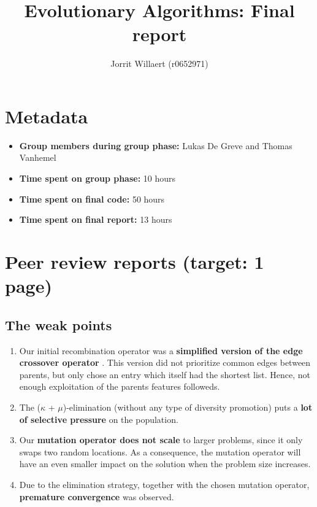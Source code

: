 \documentclass[a4paper,10pt]{article}
\title{Evolutionary Algorithms: Final report}
\author{Jorrit Willaert (r0652971)}
\newcommand{\ReplaceMe}[1]{{\color{blue}#1}}
\begin{document}
\selectfont{}


\maketitle

\section{Metadata}

\begin{itemize}
 \item \textbf{Group members during group phase:} Lukas De Greve and Thomas Vanhemel
 \item \textbf{Time spent on group phase:} \ReplaceMe{10 hours}
 \item \textbf{Time spent on final code:} \ReplaceMe{50 hours}
 \item \textbf{Time spent on final report:} \ReplaceMe{13 hours}
\end{itemize}

\section{Peer review reports (target: 1 page)}

\subsection{The weak points}
\begin{enumerate}
 \item Our initial recombination operator was a \textbf{simplified version of the edge crossover operator} \cite{initial_implementation_edge_crossover}. This version did not prioritize common edges between parents, but only chose an entry which itself had the shortest list. Hence, not enough exploitation of the parents features followeds. 
 \item The ($\kappa$ + $\mu$)-elimination (without any type of diversity promotion) puts a \textbf{lot of selective pressure} on the population.
 \item Our \textbf{mutation operator does not scale} to larger problems, since it only swaps two random locations. As a consequence, the mutation operator will have an even smaller impact on the solution when the problem size increases. 
 \item Due to the elimination strategy, together with the chosen mutation operator, \textbf{premature convergence} was observed.
\end{enumerate}
\end{document}
